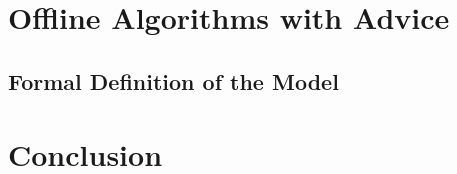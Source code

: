 \documentclass[12pt,a4paper]{report}
\begin{document}
\chapter{Offline Algorithms with Advice}
\label{chapter:offline}

\section{Formal Definition of the Model}
\label{section:offline-definition}


\chapter*{Conclusion}
\label{chapter:conclusion}



\printbibliography

\appendix

%
\end{document}
